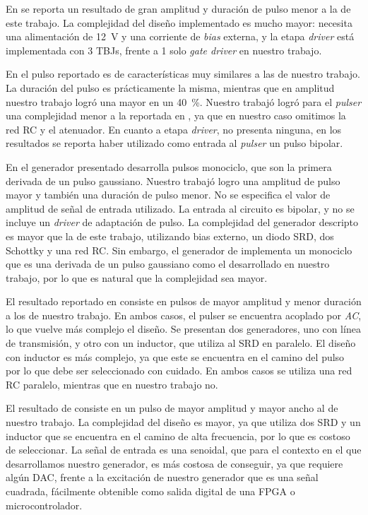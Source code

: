 En \cite{protiva2009} se reporta un resultado de gran amplitud y duración de
pulso menor a la de este trabajo. La complejidad del diseño implementado es
mucho mayor: necesita una alimentación de \qty{12}{\volt} y
una corriente de \textit{bias} externa, y la etapa \textit{driver} está
implementada con 3 TBJs, frente a 1 solo \textit{gate driver} en nuestro
trabajo.

En \cite{kamal2014} el pulso reportado es de características muy similares a las
de nuestro trabajo.  La duración del pulso es prácticamente la misma, mientras
que en amplitud nuestro trabajo logró una mayor en un \qty{40}{\percent}.
Nuestro trabajó logró para el \textit{pulser} una complejidad menor a la
reportada en \cite{kamal2014}, ya que en nuestro caso omitimos la red RC y el
atenuador. En cuanto a etapa \textit{driver}, \cite{kamal2014} no presenta
ninguna, en los resultados se reporta haber utilizado como entrada al
\textit{pulser} un pulso bipolar.

En \cite{han2002} el generador presentado desarrolla pulsos monociclo, que son
la primera derivada de un pulso gaussiano. Nuestro trabajó logro una amplitud de
pulso mayor y también una duración de pulso menor. No se especifica el valor de
amplitud de señal de entrada utilizado. La entrada al circuito es bipolar, y no
se incluye un \textit{driver} de adaptación de pulso. La complejidad del
generador descripto es mayor que la de este trabajo, utilizando bias externo, un
diodo SRD, dos Schottky y una red RC. Sin embargo, el generador de
\cite{han2002} implementa un monociclo que es una derivada de un pulso gaussiano
como el desarrollado en nuestro trabajo, por lo que es natural que la
complejidad sea mayor.

El resultado reportado en \cite{han2005} consiste en pulsos de mayor amplitud y
menor duración a los de nuestro trabajo. En ambos casos, el pulser se encuentra
acoplado por \textit{AC}, lo que vuelve más complejo el diseño.  Se presentan
dos generadores, uno con línea de transmisión, y otro con un inductor, que
utiliza al SRD en paralelo. El diseño con inductor es más complejo, ya que este
se encuentra en el camino del pulso por lo que debe ser seleccionado con
cuidado. En ambos casos se utiliza una red RC paralelo, mientras que en nuestro
trabajo no.

El resultado de \cite{oloumi2018} consiste en un pulso de mayor amplitud y mayor
ancho al de nuestro trabajo. La complejidad del diseño es mayor, ya que utiliza
dos SRD y un inductor que se encuentra en el camino de alta frecuencia, por lo
que es costoso de seleccionar. La señal de entrada es una senoidal, que para el
contexto en el que desarrollamos nuestro generador, es más costosa de conseguir,
ya que requiere algún DAC, frente a la excitación de nuestro generador que es
una señal cuadrada, fácilmente obtenible como salida digital de una FPGA o
microcontrolador.
